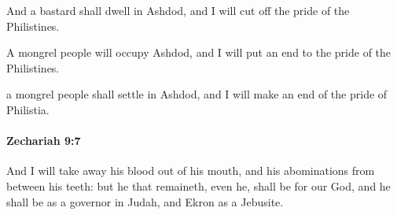 			\begin{versebox}
					\item[BHS] 
					\item[LXX] 
					\item[ASV] And a bastard shall dwell in Ashdod, and I will cut off the pride of the Philistines.
					\item[NIV] A mongrel people will occupy Ashdod, and I will put an end to the pride of the Philistines.
					\item[NRSV] a mongrel people shall settle in Ashdod, and I will make an end of the pride of Philistia.
			\end{versebox}

		\paragraph{Zechariah 9:7} %
			\label{ZECHARIAH-9-7}

			And I will take away his blood out of his mouth, and his abominations from between his teeth: but he that remaineth, even he, shall be for our God, and he shall be as a governor in Judah, and Ekron as a Jebusite.

